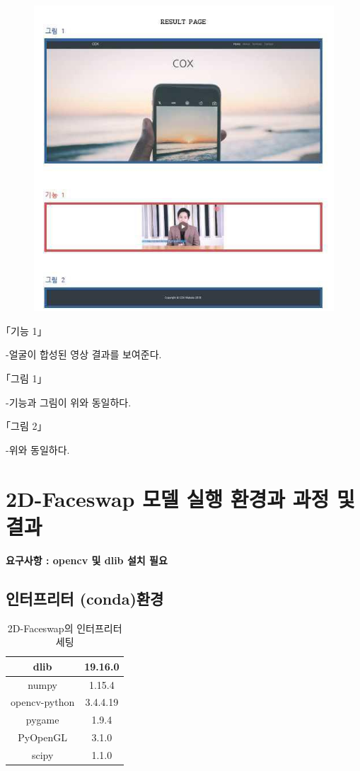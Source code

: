 \documentclass{oblivoir}
\begin{document}
\newpage
\begin{figure}[h!]
    \centering
    \includegraphics{pic/chp6/img945}
\end{figure}

｢기능 1｣

-얼굴이 합성된 영상 결과를 보여준다.

｢그림 1｣

-기능과 그림이 위와 동일하다.

｢그림 2｣

-위와 동일하다.

\section{ 2D-Faceswap 모델 실행 환경과 과정 및 결과}

\textbf{요구사항 :  opencv 및 dlib 설치 필요}

\subsection{인터프리터 (conda)환경}

\begin{table}[h!]
\centering
\begin{tabular}{|c|c|}
    \hline\hline
    dlib & 19.16.0 \\ \hline
    numpy & 1.15.4 \\             \hline
    opencv-python & 3.4.4.19\\             \hline
    pygame & 1.9.4 \\            \hline
    PyOpenGL & 3.1.0 \\            \hline
    scipy  &  1.1.0\\
    \hline\hline
\end{tabular}
\caption{2D-Faceswap의 인터프리터 세팅  }
\end{table}
\end{document}
